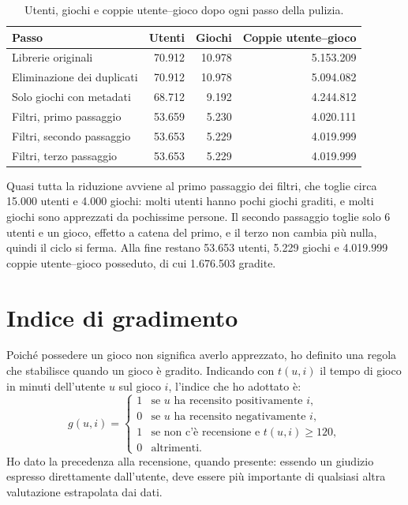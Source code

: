 \documentclass[11pt,a4paper]{article}
\begin{document}
\begin{table}[h]
\centering
\begin{tabular}{lrrr}
\toprule
Passo & Utenti & Giochi & Coppie utente--gioco \\
\midrule
Librerie originali             & 70.912 & 10.978 & 5.153.209 \\
Eliminazione dei duplicati     & 70.912 & 10.978 & 5.094.082 \\
Solo giochi con metadati       & 68.712 &  9.192 & 4.244.812 \\
Filtri, primo passaggio        & 53.659 &  5.230 & 4.020.111 \\
Filtri, secondo passaggio      & 53.653 &  5.229 & 4.019.999 \\
Filtri, terzo passaggio        & 53.653 &  5.229 & 4.019.999 \\
\bottomrule
\end{tabular}
\caption{Utenti, giochi e coppie utente--gioco dopo ogni passo della pulizia.}
\label{tab:pulizia}
\end{table}

Quasi tutta la riduzione avviene al primo passaggio dei filtri, che toglie circa
15.000 utenti e 4.000 giochi: molti utenti hanno pochi giochi graditi, e molti
giochi sono apprezzati da pochissime persone. Il secondo passaggio toglie solo 6
utenti e un gioco, effetto a catena del primo, e il terzo non cambia più nulla,
quindi il ciclo si ferma. Alla fine restano 53.653 utenti, 5.229 giochi e
4.019.999 coppie utente--gioco posseduto, di cui 1.676.503 gradite.

\section{Indice di gradimento}
\label{sec:gradimento}

Poiché possedere un gioco non significa averlo apprezzato, ho definito una regola
che stabilisce quando un gioco è gradito. Indicando con $t(u,i)$ il tempo di
gioco in minuti dell'utente $u$ sul gioco $i$, l'indice che ho adottato è:
\[
g(u,i) =
\begin{cases}
1 & \text{se } u \text{ ha recensito positivamente } i,\\
0 & \text{se } u \text{ ha recensito negativamente } i,\\
1 & \text{se non c'è recensione e } t(u,i) \geq 120,\\
0 & \text{altrimenti.}
\end{cases}
\]
Ho dato la precedenza alla recensione, quando presente: essendo un giudizio
espresso direttamente dall'utente, deve essere più importante di qualsiasi altra valutazione estrapolata dai dati.
\end{document}
